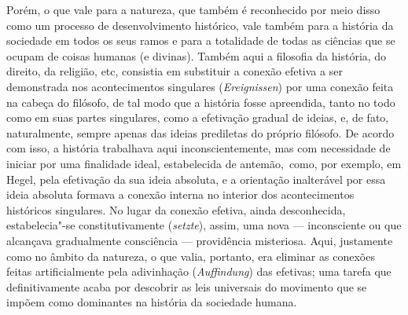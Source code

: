 Porém, o que vale para a natureza, que também é reconhecido por meio
disso como um processo de desenvolvimento histórico, vale também para a
história da sociedade em todos os seus ramos e para a totalidade de
todas as ciências que se ocupam de coisas humanas (e divinas). Também
aqui a filosofia da história, do direito, da religião, etc, consistia em
substituir a conexão efetiva a ser demonstrada nos acontecimentos
singulares (\emph{Ereignissen}) por uma conexão feita na cabeça do
filósofo, de tal modo que a história fosse apreendida, tanto no todo
como em suas partes singulares, como a efetivação gradual de ideias, e,
de fato, naturalmente, sempre apenas das ideias prediletas do próprio
filósofo. De acordo com isso, a história trabalhava aqui
inconscientemente, mas com necessidade de iniciar por uma finalidade
ideal, estabelecida de antemão,\est\ como, por exemplo,
em Hegel,
pela efetivação da sua ideia absoluta, e a orientação inalterável por
essa ideia absoluta formava a conexão interna no interior dos
acontecimentos históricos singulares. No lugar da conexão efetiva, ainda
desconhecida, estabelecia"-se constitutivamente (\emph{setzte}), assim,
uma nova --- inconsciente ou que alcançava gradualmente consciência ---
providência misteriosa. Aqui, justamente como no âmbito da natureza, o
que valia, portanto, era eliminar as conexões feitas artificialmente
pela adivinhação (\emph{Auffindung}) das efetivas; uma tarefa que
definitivamente acaba por descobrir as leis universais do movimento que
se impõem como dominantes na história da sociedade humana.

